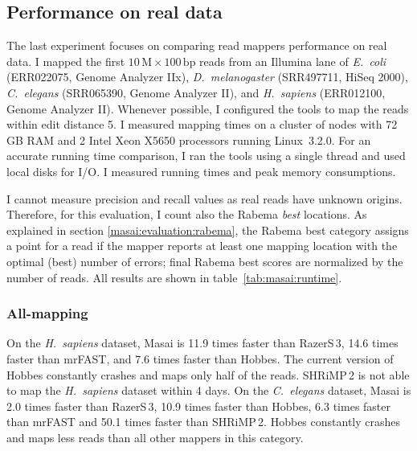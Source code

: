 \subsection{Performance on real data}
\label{masai:evaluation:performance}

The last experiment focuses on comparing read mappers performance on real data.
I mapped the first $10\,\text{M}\times 100\,\text{bp}$ reads from an Illumina lane of \emph{E.~coli} (ERR022075, Genome Analyzer IIx), \emph{D.~melanogaster} (SRR497711, HiSeq 2000), \emph{C.~elegans} (SRR065390, Genome Analyzer II), and \emph{H.~sapiens} (ERR012100, Genome Analyzer II).
Whenever possible, I configured the tools to map the reads within edit distance 5.
I measured mapping times on a cluster of nodes with 72\,GB RAM and 2 Intel Xeon X5650 processors running Linux~3.2.0.
For an accurate running time comparison, I ran the tools using a single thread and used local disks for I/O.
I measured running times and peak memory consumptions.

I cannot measure precision and recall values as real reads have unknown origins.
Therefore, for this evaluation, I count also the Rabema \emph{best} locations.
As explained in section \ref{masai:evaluation:rabema}, the Rabema best category assigns a point for a read if the mapper reports at least one mapping location with the optimal (\ie best) number of errors;
final Rabema best scores are normalized by the number of reads.
All results are shown in table~\ref{tab:masai:runtime}.

\subsubsection{All-mapping}
On the \emph{H.~sapiens} dataset, Masai is 11.9 times faster than RazerS\,3, 14.6 times faster than mrFAST, and 7.6 times faster than Hobbes.
The current version of Hobbes constantly crashes and maps only half of the reads.
SHRiMP\,2 is not able to map the \emph{H.~sapiens} dataset within 4 days.
On the \emph{C.~elegans} dataset, Masai is 2.0 times faster than RazerS\,3, 10.9 times faster than Hobbes, 6.3 times faster than mrFAST and 50.1 times faster than SHRiMP\,2.
Hobbes constantly crashes and maps less reads than all other mappers in this category.


